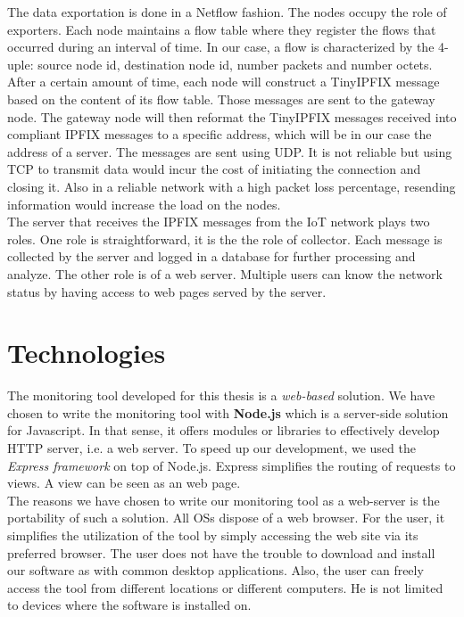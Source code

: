 The data exportation is done in a Netflow fashion. The nodes occupy the role of exporters. Each node maintains a flow table where they register the flows that occurred during an interval of time. In our case, a flow is characterized by the 4-uple: source node id, destination node id, number packets and number octets. After a certain amount of time, each node will construct a TinyIPFIX message based on the content of its flow table. Those messages are sent to the gateway node. The gateway node will then reformat the TinyIPFIX messages received into compliant IPFIX messages to a specific address, which will be in our case the address of a server. The messages are sent using UDP. It is not reliable but using TCP to transmit data would incur the cost of initiating the connection and closing it. Also in a reliable network with a high packet loss percentage, resending information would increase the load on the nodes.\\

The server that receives the IPFIX messages from the IoT network plays two roles. One role is straightforward, it is the the role of collector. Each message is collected by the server and logged in a database for further processing and analyze. The other role is of a web server. Multiple users can know the network status by having access to web pages served by the server.

\section{Technologies}

The monitoring tool developed for this thesis is a \textit{web-based} solution. We have chosen to write the monitoring tool with \textbf{Node.js} \cite{website:nodejs} which is a server-side solution for Javascript. In that sense, it offers modules or libraries to effectively develop HTTP server, i.e. a web server. To speed up our development, we used the \textit{Express framework} \cite{website:express} on top of Node.js. Express simplifies the routing of requests to views. A view can be seen as an web page. \\

The reasons we have chosen to write our monitoring tool as a web-server is the portability of such a solution. All OSs dispose of a web browser. For the user, it simplifies the utilization of the tool by simply accessing the web site via its preferred browser. The user does not have the trouble to download and install our software as with common desktop applications. Also, the user can freely access the tool from different locations or different computers. He is not limited to devices where the software is installed on. \\

